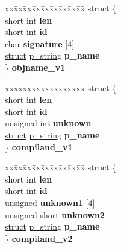\begin{DoxyCompactItemize}
\begin{tabbing}
\end{tabbing}\item 
\mbox{\label{unioncodeview__symbol_af99203354025b8e5d4d0fafdc481a207}} 
\begin{tabbing}
xx\=xx\=xx\=xx\=xx\=xx\=xx\=xx\=xx\=\kill
struct \{\\
\>short int {\bfseries len}\\
\>short int {\bfseries id}\\
\>char {\bfseries signature} \mbox{[}4\mbox{]}\\
\>\hyperlink{interfacestruct}{struct} \hyperlink{structp__string}{p\_string} {\bfseries p\_name}\\
\} {\bfseries objname\_v1}\\

\end{tabbing}\item 
\mbox{\label{unioncodeview__symbol_ab914954fb16615ae010d660c8dd8b7a1}} 
\begin{tabbing}
xx\=xx\=xx\=xx\=xx\=xx\=xx\=xx\=xx\=\kill
struct \{\\
\>short int {\bfseries len}\\
\>short int {\bfseries id}\\
\>unsigned int {\bfseries unknown}\\
\>\hyperlink{interfacestruct}{struct} \hyperlink{structp__string}{p\_string} {\bfseries p\_name}\\
\} {\bfseries compiland\_v1}\\

\end{tabbing}\item 
\mbox{\label{unioncodeview__symbol_a53dc555733615efb2c81427ed4780683}} 
\begin{tabbing}
xx\=xx\=xx\=xx\=xx\=xx\=xx\=xx\=xx\=\kill
struct \{\\
\>short int {\bfseries len}\\
\>short int {\bfseries id}\\
\>unsigned {\bfseries unknown1} \mbox{[}4\mbox{]}\\
\>unsigned short {\bfseries unknown2}\\
\>\hyperlink{interfacestruct}{struct} \hyperlink{structp__string}{p\_string} {\bfseries p\_name}\\
\} {\bfseries compiland\_v2}\\


\end{tabbing}
\end{DoxyCompactItemize}
